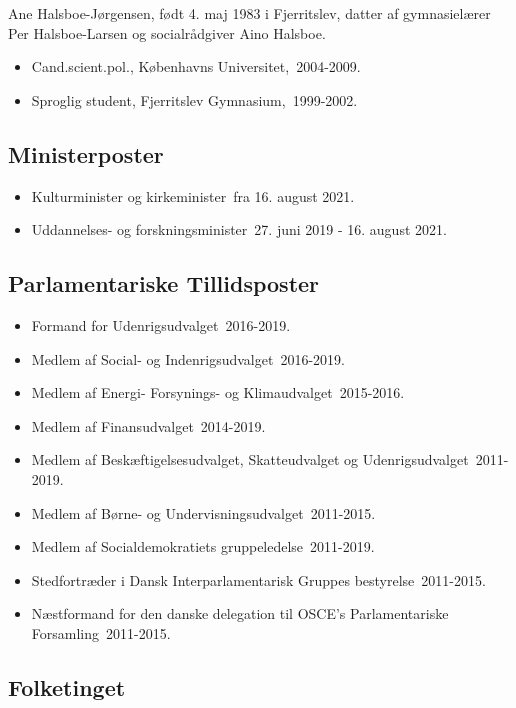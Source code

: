 \documentclass[11pt, a4paper]{awesome-cv}
\begin{document}
\makecvheader[R]
\makelettertitle
\begin{cvletter}
Ane Halsboe-Jørgensen, født 4. maj 1983 i Fjerritslev, datter af gymnasielærer Per Halsboe-Larsen og socialrådgiver Aino Halsboe.

\begin{itemize}
\item Cand.scient.pol., Københavns Universitet, 2004-2009.
\item Sproglig student, Fjerritslev Gymnasium, 1999-2002.
\end{itemize}
\subsection*{Ministerposter}
\begin{itemize}
\item Kulturminister og kirkeminister fra 16. august 2021.
\item Uddannelses- og forskningsminister 27. juni 2019 - 16. august 2021.
\end{itemize}
\subsection*{Parlamentariske Tillidsposter}
\begin{itemize}
\item Formand for Udenrigsudvalget 2016-2019.
\item Medlem af Social- og Indenrigsudvalget 2016-2019.
\item Medlem af Energi- Forsynings- og Klimaudvalget 2015-2016.
\item Medlem af Finansudvalget 2014-2019.
\item Medlem af Beskæftigelsesudvalget, Skatteudvalget og Udenrigsudvalget 2011-2019.
\item Medlem af Børne- og Undervisningsudvalget 2011-2015.
\item Medlem af Socialdemokratiets gruppeledelse 2011-2019.
\item Stedfortræder i Dansk Interparlamentarisk Gruppes bestyrelse 2011-2015.
\item Næstformand for den danske delegation til OSCE’s Parlamentariske Forsamling 2011-2015.
\end{itemize}
\subsection*{Folketinget}

\end{cvletter}
\end{document}
